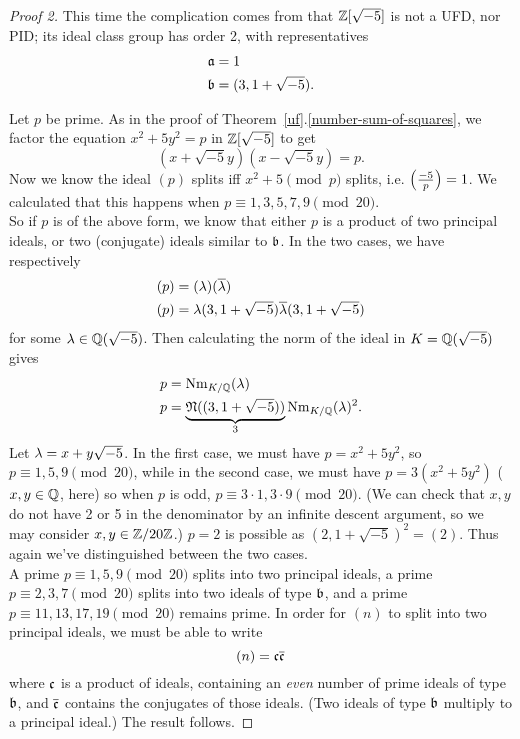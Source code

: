 \begin{proof}[Proof 2]
This time the complication comes from that $\mathbb{Z}[\sqrt{-5}]$ is not a UFD, nor PID; its ideal class group has order 2, with representatives 
\begin{align*}
\mathfrak{a}&=1\\
\mathfrak{b}&=(3,1+\sqrt{-5}).
\end{align*}

Let $p$ be prime. 
As in the proof of Theorem~\ref{uf}.\ref{number-sum-of-squares}, we factor the equation $x^2+5y^2=p$ in $\mathbb{Z}[\sqrt{-5}]$ to get
\[
(x+\sqrt{-5}y)(x-\sqrt{-5}y)=p.
\]
Now we know the ideal $(p)$ splits iff $x^2+5\pmod p$ splits, i.e. $\left( {\frac{-5}{p}} \right)=1$. We calculated that this happens when $p\equiv 1,3,5,7,9\pmod{20}$.\\

So if $p$ is of the above form, we know that either $p$ is a product of two principal ideals, or two (conjugate) ideals similar to $\mathfrak{b}$. In the two cases, we have respectively
\begin{align*}
(p)&=(\lambda)(\overline{\lambda})\\
(p)&=\lambda(3,1+\sqrt{-5})\overline{\lambda}(3,1+\sqrt{-5})
\end{align*}
for some $\lambda\in \mathbb{Q}(\sqrt{-5})$. 
Then calculating the norm of the ideal in $K=\mathbb{Q}(\sqrt{-5})$ gives
\begin{align*}
p&=\operatorname{Nm}_{K/\mathbb{Q}}(\lambda)\\
p&=\underbrace{\mathfrak N((3,1+\sqrt{-5}))}_3\operatorname{Nm}_{K/\mathbb{Q}}(\lambda)^2.
\end{align*}Let $\lambda=x+y\sqrt{-5}$.
In the first case, we must have $p=x^2+5y^2$, so $p\equiv 1,5,9\pmod{20}$, while in the second case, we must have $p=3(x^2+5y^2)$ ($x,y\in \mathbb{Q}$, here) so when $p$ is odd, $p\equiv 3\cdot 1,3\cdot 9\pmod{20}$. (We can check that $x,y$ do not have 2 or 5 in the denominator by an infinite descent argument, so we may consider $x,y\in \mathbb{Z}/20\mathbb{Z}$.) $p=2$ is possible as $(2,1+\sqrt{-5})^2=(2)$. 
Thus again we've distinguished between the two cases.\\

A prime $p\equiv 1,5,9\pmod{20}$ splits into two principal ideals, a prime $p\equiv 2,3,7\pmod{20}$ splits into two ideals of type $\mathfrak{b}$, and a prime $p\equiv 11,13, 17, 19\pmod{20}$ remains prime. In order for $(n)$ to split into two principal ideals, we must be able to write
\[
(n)=\mathfrak{c}\overline{\mathfrak{c}}
\]
where $\mathfrak{c}$ is a product of ideals, containing an {\it even} number of prime ideals of type $\mathfrak{b}$, and $\overline{\mathfrak{c}}$ contains the conjugates of those ideals. (Two ideals of type $\mathfrak{b}$ multiply to a principal ideal.) The result follows.
\end{proof}
